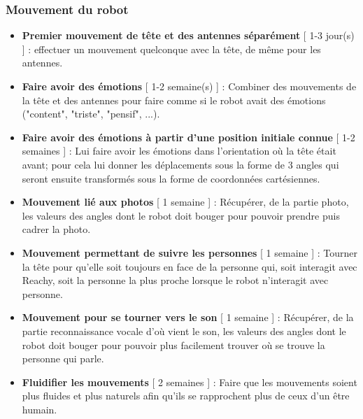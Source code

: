 \subsubsection{Mouvement du robot}
\begin{itemize}
    \item \textbf{Premier mouvement de tête et des antennes séparément} [ 1-3 jour(s) ] : effectuer un mouvement quelconque avec la tête, de même pour les antennes.
    \item \textbf{Faire avoir des émotions} [ 1-2 semaine(s) ] : Combiner des mouvements de la tête et des antennes pour faire comme si le robot avait des émotions ("content", "triste", "pensif", ...).
    \item \textbf{Faire avoir des émotions à partir d'une position initiale connue} [ 1-2 semaines ] : Lui faire avoir les émotions dans l'orientation où la tête était avant; pour cela lui donner les déplacements sous la forme de 3 angles qui seront ensuite transformés sous la forme de coordonnées cartésiennes.
    \item \textbf{Mouvement lié aux photos} [ 1 semaine ] : Récupérer, de la partie photo, les valeurs des angles dont le robot doit bouger pour pouvoir prendre puis cadrer la photo.
    \item \textbf{Mouvement permettant de suivre les personnes} [ 1 semaine ] : Tourner la tête pour qu'elle soit toujours en face de la personne qui, soit interagit avec Reachy, soit la personne la plus proche lorsque le robot n'interagit avec personne.
    \item \textbf{Mouvement pour se tourner vers le son} [ 1 semaine ] : Récupérer, de la partie reconnaissance vocale d'où vient le son, les valeurs des angles dont le robot doit bouger pour pouvoir plus facilement trouver où se trouve la personne qui parle.
    \item \textbf{Fluidifier les mouvements} [ 2 semaines ] : Faire que les mouvements soient plus fluides et plus naturels afin qu'ils se rapprochent plus de ceux d'un être humain.
\end{itemize}

